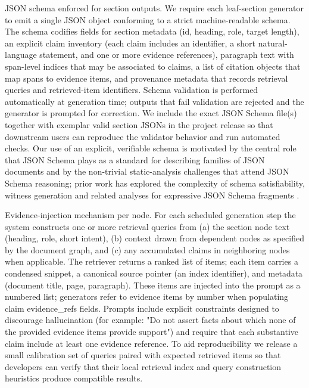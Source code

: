 \documentclass{article}%
\begin{document}
JSON schema enforced for section outputs.
We require each leaf-section generator to emit a single JSON object conforming to a strict machine-readable schema. The schema codifies fields for section metadata (id, heading, role, target length), an explicit claim inventory (each claim includes an identifier, a short natural-language statement, and one or more evidence references), paragraph text with span-level indices that may be associated to claims, a list of citation objects that map spans to evidence items, and provenance metadata that records retrieval queries and retrieved-item identifiers. Schema validation is performed automatically at generation time; outputs that fail validation are rejected and the generator is prompted for correction. We include the exact JSON Schema file(s) together with exemplar valid section JSONs in the project release so that downstream users can reproduce the validator behavior and run automated checks. Our use of an explicit, verifiable schema is motivated by the central role that JSON Schema plays as a standard for describing families of JSON documents and by the non-trivial static-analysis challenges that attend JSON Schema reasoning; prior work has explored the complexity of schema satisfiability, witness generation and related analyses for expressive JSON Schema fragments \cite{web_attouche_2022_witness_generation_for_json_schema,web_baazizi_2021_not_elimination_and_witness_generation_for_json_}.

Evidence-injection mechanism per node.
For each scheduled generation step the system constructs one or more retrieval queries from (a) the section node text (heading, role, short intent), (b) context drawn from dependent nodes as specified by the document graph, and (c) any accumulated claims in neighboring nodes when applicable. The retriever returns a ranked list of items; each item carries a condensed snippet, a canonical source pointer (an index identifier), and metadata (document title, page, paragraph). These items are injected into the prompt as a numbered list; generators refer to evidence items by number when populating claim evidence_refs fields. Prompts include explicit constraints designed to discourage hallucination (for example: "Do not assert facts about which none of the provided evidence items provide support") and require that each substantive claim include at least one evidence reference. To aid reproducibility we release a small calibration set of queries paired with expected retrieved items so that developers can verify that their local retrieval index and query construction heuristics produce compatible results.
\end{document}

